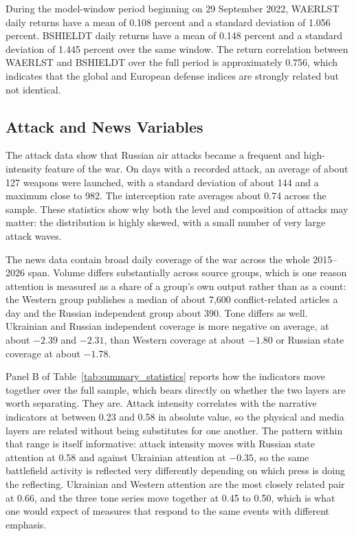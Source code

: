 \documentclass[12pt,a4paper]{article}
\begin{document}
During the model-window period beginning on 29 September 2022, WAERLST daily returns have a mean of 0.108 percent and a standard deviation of 1.056 percent. BSHIELDT daily returns have a mean of 0.148 percent and a standard deviation of 1.445 percent over the same window. The return correlation between WAERLST and BSHIELDT over the full period is approximately 0.756, which indicates that the global and European defense indices are strongly related but not identical.

\subsection{Attack and News Variables}

The attack data show that Russian air attacks became a frequent and high-intensity feature of the war. On days with a recorded attack, an average of about 127 weapons were launched, with a standard deviation of about 144 and a maximum close to 982. The interception rate averages about 0.74 across the sample. These statistics show why both the level and composition of attacks may matter: the distribution is highly skewed, with a small number of very large attack waves.

The news data contain broad daily coverage of the war across the whole 2015--2026 span. Volume differs substantially across source groups, which is one reason attention is measured as a share of a group's own output rather than as a count: the Western group publishes a median of about 7,600 conflict-related articles a day and the Russian independent group about 390. Tone differs as well. Ukrainian and Russian independent coverage is more negative on average, at about $-2.39$ and $-2.31$, than Western coverage at about $-1.80$ or Russian state coverage at about $-1.78$.

Panel B of Table~\ref{tab:summary_statistics} reports how the indicators move together over the full sample, which bears directly on whether the two layers are worth separating. They are. Attack intensity correlates with the narrative indicators at between 0.23 and 0.58 in absolute value, so the physical and media layers are related without being substitutes for one another. The pattern within that range is itself informative: attack intensity moves with Russian state attention at 0.58 and against Ukrainian attention at $-0.35$, so the same battlefield activity is reflected very differently depending on which press is doing the reflecting. Ukrainian and Western attention are the most closely related pair at 0.66, and the three tone series move together at 0.45 to 0.50, which is what one would expect of measures that respond to the same events with different emphasis.
\end{document}
